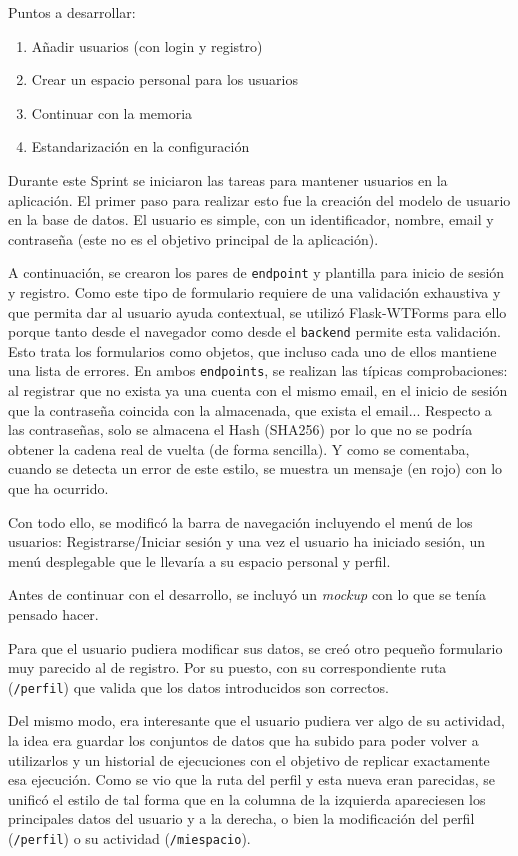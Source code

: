 Puntos a desarrollar:
\begin{enumerate}
    \item Añadir usuarios (con login y registro)
    \item Crear un espacio personal para los usuarios
    \item Continuar con la memoria
    \item Estandarización en la configuración
\end{enumerate}

Durante este Sprint se iniciaron las tareas para mantener usuarios en la
aplicación. El primer paso para realizar esto fue la creación del modelo de
usuario en la base de datos. El usuario es simple, con un identificador, nombre,
email y contraseña (este no es el objetivo principal de la aplicación).

A continuación, se crearon los pares de \texttt{endpoint} y plantilla para
inicio de sesión y registro. Como este tipo de formulario requiere de una
validación exhaustiva y que permita dar al usuario ayuda contextual, se utilizó
Flask-WTForms para ello porque tanto desde el navegador como desde el
\texttt{backend} permite esta validación. Esto trata los formularios como
objetos, que incluso cada uno de ellos mantiene una lista de errores. En ambos
\texttt{endpoints}, se realizan las típicas comprobaciones: al registrar que no
exista ya una cuenta con el mismo email, en el inicio de sesión que la
contraseña coincida con la almacenada, que exista el email... Respecto a las
contraseñas, solo se almacena el Hash (SHA256) por lo que no se podría obtener
la cadena real de vuelta (de forma sencilla). Y como se comentaba, cuando se
detecta un error de este estilo, se muestra un mensaje (en rojo) con lo que ha
ocurrido.

Con todo ello, se modificó la barra de navegación incluyendo el menú de los
usuarios: Registrarse/Iniciar sesión y una vez el usuario ha iniciado sesión, un
menú desplegable que le llevaría a su espacio personal y perfil.

Antes de continuar con el desarrollo, se incluyó un \textit{mockup} con lo que
se tenía pensado hacer.

Para que el usuario pudiera modificar sus datos, se creó otro pequeño formulario
muy parecido al de registro. Por su puesto, con su correspondiente ruta
(\texttt{/perfil}) que valida que los datos introducidos son correctos.

Del mismo modo, era interesante que el usuario pudiera ver algo de su
actividad, la idea era guardar los conjuntos de datos que ha subido para poder
volver a utilizarlos y un historial de ejecuciones con el objetivo de replicar
exactamente esa ejecución. Como se vio que la ruta del perfil y esta nueva eran
parecidas, se unificó el estilo de tal forma que en la columna de la izquierda
apareciesen los principales datos del usuario y a la derecha, o bien la
modificación del perfil (\texttt{/perfil}) o su actividad (\texttt{/miespacio}).

